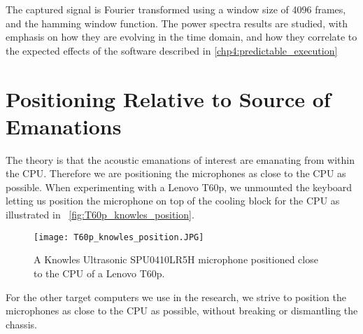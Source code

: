 The captured signal is Fourier transformed using a window size of 4096 frames, and the hamming window function. The power spectra results are studied, with emphasis on how they are evolving in the time domain, and how they correlate to the expected effects of the software described in \autoref{chp4:predictable_execution}

\section{Positioning Relative to Source of Emanations}\label{chp3:sec:capturing_audio_fingerprint}
The theory is that the acoustic emanations of interest are emanating from within the \gls{CPU}.
Therefore we are positioning the microphones as close to the \gls{CPU} as possible. 
When experimenting with a Lenovo T60p, we unmounted the keyboard letting us position the microphone on top of the cooling block for the \gls{CPU} as illustrated in ~\autoref{fig:T60p_knowles_position}. 

\begin{figure}[ht]
  \centering
  \texttt{[image: T60p\_knowles\_position.JPG]}
  \caption{A Knowles Ultrasonic SPU0410LR5H microphone positioned close to the CPU of a Lenovo T60p.}
  \label{fig:T60p_knowles_position}
\end{figure}

For the other target computers we use in the research, we strive to position the microphones as close to the CPU as possible, without breaking or dismantling the chassis.
